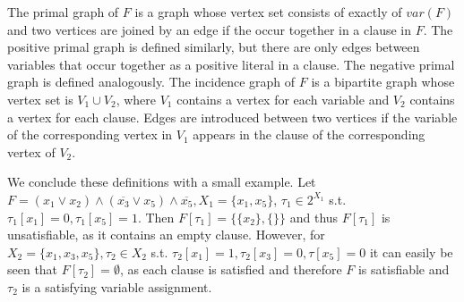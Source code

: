 \documentclass[11pt,a4paper]{article}
\theoremstyle{definition}
\theoremstyle{proposition}
\begin{document}
The primal graph of $F$ is a graph whose vertex set consists of exactly of $var(F)$ and two vertices are joined by an edge if the occur together in a clause in $F$. The positive primal graph is defined similarly, but there are only edges between variables that occur together as a positive literal in a clause. The negative primal graph is defined analogously. The incidence graph of $F$ is a bipartite graph whose vertex set is $V_1 \cup V_2$, where $V_1$ contains a vertex for each variable and $V_2$ contains a vertex for each clause. Edges are introduced between two vertices if the variable of the corresponding vertex in $V_1$ appears in the clause of the corresponding vertex of $V_2$. 

We conclude these definitions with a small example. Let $F = (x_1 \lor x_2) \land (\overline{x_3} \lor x_5) \land \overline{x_5}, X_1 = \{x_1, x_5\}$, $\tau_1 \in 2^{X_1}$ s.t. $\tau_1[x_1] = 0, \tau_1[x_5] = 1$. Then $F[\tau_1] = \{\{x_2\}, \{\}\}$ and thus $F[\tau_1]$ is unsatisfiable, as it contains an empty clause. However, for $X_2 = \{x_1, x_3, x_5\}, \tau_2 \in X_2$ s.t. $\tau_2[x_1] = 1, \tau_2[x_3] = 0, \tau[x_5] = 0$ it can easily be seen that $F[\tau_2] = \emptyset$, as each clause is satisfied and therefore $F$ is satisfiable and $\tau_2$ is a satisfying variable assignment. \\
\end{document}
